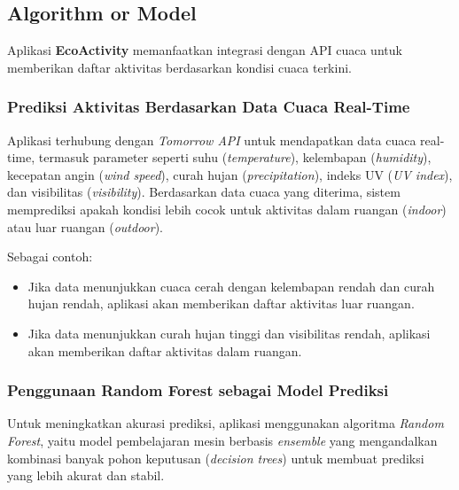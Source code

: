 \documentclass[journal,article,submit,pdftex,moreauthors]{Definitions/mdpi}
\begin{document}
\subsection{Algorithm or Model}

Aplikasi \textbf{EcoActivity} memanfaatkan integrasi dengan API cuaca untuk memberikan daftar aktivitas berdasarkan kondisi cuaca terkini. 

\subsubsection*{Prediksi Aktivitas Berdasarkan Data Cuaca Real-Time}
Aplikasi terhubung dengan \textit{Tomorrow API} untuk mendapatkan data cuaca real-time, termasuk parameter seperti suhu (\textit{temperature}), kelembapan (\textit{humidity}), kecepatan angin (\textit{wind speed}), curah hujan (\textit{precipitation}), indeks UV (\textit{UV index}), dan visibilitas (\textit{visibility}). Berdasarkan data cuaca yang diterima, sistem memprediksi apakah kondisi lebih cocok untuk aktivitas dalam ruangan (\textit{indoor}) atau luar ruangan (\textit{outdoor}).

Sebagai contoh:
\begin{itemize}
    \item Jika data menunjukkan cuaca cerah dengan kelembapan rendah dan curah hujan rendah, aplikasi akan memberikan daftar aktivitas luar ruangan.
    \item Jika data menunjukkan curah hujan tinggi dan visibilitas rendah, aplikasi akan memberikan daftar aktivitas dalam ruangan.
\end{itemize}

\subsubsection*{Penggunaan Random Forest sebagai Model Prediksi}
Untuk meningkatkan akurasi prediksi, aplikasi menggunakan algoritma \textit{Random Forest}, yaitu model pembelajaran mesin berbasis \textit{ensemble} yang mengandalkan kombinasi banyak pohon keputusan (\textit{decision trees}) untuk membuat prediksi yang lebih akurat dan stabil.
\end{document}
